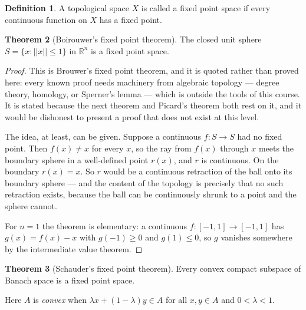 \documentclass[11pt,a4paper]{article}
\theoremstyle{definition}
\newtheorem{thm}{Theorem}[section]
\newtheorem{defn}[thm]{Definition}
\begin{document}
\begin{defn}
A topological space $X$ is called a fixed point space if every continuous function on $X$ has a fixed point.

\end{defn}

\begin{thm}[Boirouwer's fixed point theorem]
The closed unit sphere $S=\{x:||x||\leq 1\}$ in $\mathbb{R}^n$ is a fixed point space.

\end{thm}

\begin{proof}
This is Brouwer's fixed point theorem, and it is quoted rather than proved here:
every known proof needs machinery from algebraic topology --- degree theory,
homology, or Sperner's lemma --- which is outside the tools of this course. It
is stated because the next theorem and Picard's theorem both rest on it, and it
would be dishonest to present a proof that does not exist at this level.

The idea, at least, can be given. Suppose a continuous $f:S\rightarrow S$ had no
fixed point. Then $f(x)\neq x$ for every $x$, so the ray from $f(x)$ through
$x$ meets the boundary sphere in a well-defined point $r(x)$, and $r$ is
continuous. On the boundary $r(x)=x$. So $r$ would be a continuous retraction
of the ball onto its boundary sphere --- and the content of the topology is
precisely that no such retraction exists, because the ball can be continuously
shrunk to a point and the sphere cannot.

For $n=1$ the theorem is elementary: a continuous $f:[-1,1]\rightarrow[-1,1]$
has $g(x)=f(x)-x$ with $g(-1)\geq 0$ and $g(1)\leq 0$, so $g$ vanishes
somewhere by the intermediate value theorem.
\end{proof}


\begin{thm}[Schauder's fixed point theorem]
Every convex compact subspace of Banach space is a fixed point space.

Here $A$ is \emph{convex} when $\lambda x+(1-\lambda)y\in A$ for all
$x,y\in A$ and $0<\lambda<1$.

\end{thm}
\end{document}
